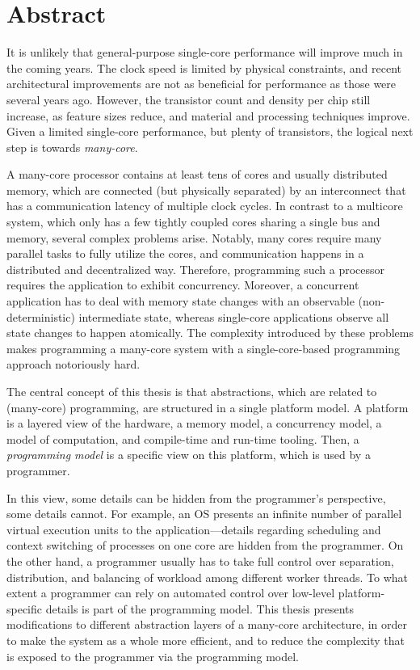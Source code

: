 %
\chapter*{Abstract}

It is unlikely that general-purpose single-core performance will improve much in the coming years.
The clock speed is limited by physical constraints, and recent architectural improvements are not as beneficial for performance as those were several years ago.
However, the transistor count and density per chip still increase, as feature sizes reduce, and material and processing techniques improve.
Given a limited single-core performance, but plenty of transistors, the logical next step is towards \emph{many-core}.

A many-core processor contains at least tens of cores and usually distributed memory, which are connected (but physically separated) by an interconnect that has a communication latency of multiple clock cycles.
In contrast to a multicore system, which only has a few tightly coupled cores sharing a single bus and memory, several complex problems arise.
Notably, many cores require many parallel tasks to fully utilize the cores, and communication happens in a distributed and decentralized way.
Therefore, programming such a processor requires the application to exhibit concurrency.
Moreover, a concurrent application has to deal with memory state changes with an observable (non-deterministic) intermediate state, whereas single-core applications observe all state changes to happen atomically.
The complexity introduced by these problems makes programming a many-core system with a single-core-based programming approach notoriously hard.

The central concept of this thesis is that abstractions, which are related to (many-core) programming, are structured in a single platform model.
A platform is a layered view of the hardware, a memory model, a concurrency model, a model of computation, and compile-time and run-time tooling.
Then, a \emph{programming model} is a specific view on this platform, which is used by a programmer.

In this view, some details can be hidden from the programmer's perspective, some details cannot.
For example, an \acl{OS} presents an infinite number of parallel virtual execution units to the application---details regarding scheduling and context switching of processes on one core are hidden from the programmer.
On the other hand, a programmer usually has to take full control over separation, distribution, and balancing of workload among different worker threads.
To what extent a programmer can rely on automated control over low-level platform-specific details is part of the programming model.
This thesis presents modifications to different abstraction layers of a many-core architecture, in order to make the system as a whole more efficient, and to reduce the complexity that is exposed to the programmer via the programming model.

